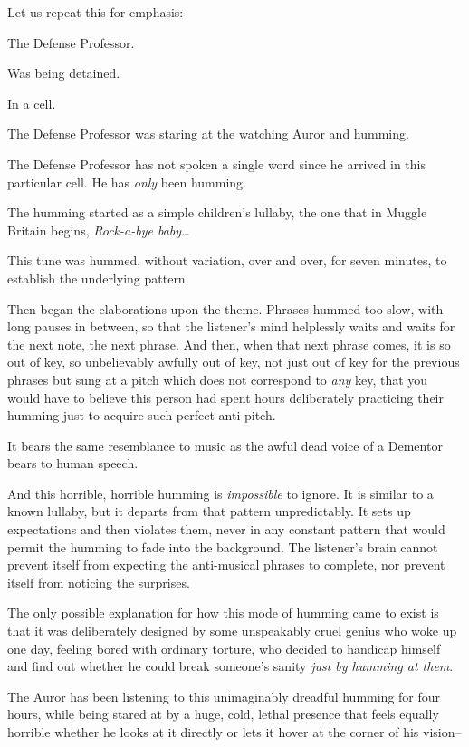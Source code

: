 Let us repeat this for emphasis:

The Defense Professor.

Was being detained.

In a cell.

The Defense Professor was staring at the watching Auror and humming.

The Defense Professor has not spoken a single word since he arrived in this particular cell. He has \emph{only} been humming.

The humming started as a simple children's lullaby, the one that in Muggle Britain begins, \emph{Rock-a-bye baby{\ldots}}

This tune was hummed, without variation, over and over, for seven minutes, to establish the underlying pattern.

Then began the elaborations upon the theme. Phrases hummed too slow, with long pauses in between, so that the listener's mind helplessly waits and waits for the next note, the next phrase. And then, when that next phrase comes, it is so out of key, so unbelievably awfully out of key, not just out of key for the previous phrases but sung at a pitch which does not correspond to \emph{any} key, that you would have to believe this person had spent hours deliberately practicing their humming just to acquire such perfect anti-pitch.

It bears the same resemblance to music as the awful dead voice of a Dementor bears to human speech.

And this horrible, horrible humming is \emph{impossible} to ignore. It is similar to a known lullaby, but it departs from that pattern unpredictably. It sets up expectations and then violates them, never in any constant pattern that would permit the humming to fade into the background. The listener's brain cannot prevent itself from expecting the anti-musical phrases to complete, nor prevent itself from noticing the surprises.

The only possible explanation for how this mode of humming came to exist is that it was deliberately designed by some unspeakably cruel genius who woke up one day, feeling bored with ordinary torture, who decided to handicap himself and find out whether he could break someone's sanity \emph{just by humming at them}.

The Auror has been listening to this unimaginably dreadful humming for four hours, while being stared at by a huge, cold, lethal presence that feels equally horrible whether he looks at it directly or lets it hover at the corner of his vision\---


